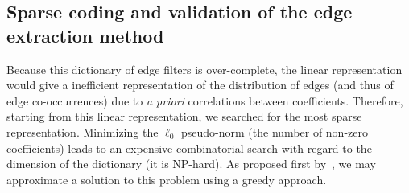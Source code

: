 \documentclass[a4paper]{article}
\newcounter{num}
\begin{document}
\subsection{Sparse coding and validation of the edge extraction method}
Because this dictionary of edge filters is over-complete, the linear
representation would give a inefficient representation of the
distribution of edges (and thus of edge co-occurrences) due to {\it a
  priori} correlations between coefficients.  Therefore, starting from
this linear representation, we searched for the most sparse
representation.  Minimizing the $\ell_0$ pseudo-norm (the number of
non-zero coefficients) leads to an expensive combinatorial search with
regard to the dimension of the dictionary (it is NP-hard).  As
proposed first by~\textcite{Perrinet02sparse}, we may approximate a
solution to this problem using a greedy approach.
\end{document}

